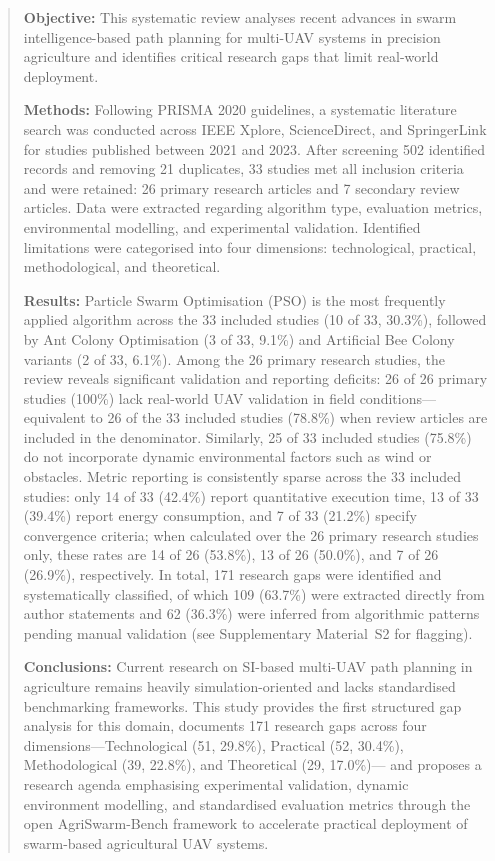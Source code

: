 \documentclass[review,3p,times]{elsarticle}
\begin{document}
\begin{frontmatter}
\begin{abstract}
\textbf{Objective:} This systematic review analyses recent advances in swarm
intelligence-based path planning for multi-UAV systems in precision agriculture and
identifies critical research gaps that limit real-world deployment.

\textbf{Methods:} Following PRISMA 2020 guidelines, a systematic literature search
was conducted across IEEE Xplore, ScienceDirect, and SpringerLink for studies
published between 2021 and 2023. After screening 502 identified records and removing
21 duplicates, 33 studies met all inclusion criteria and were retained: 26 primary
research articles and 7 secondary review articles. Data were extracted regarding
algorithm type, evaluation metrics, environmental modelling, and experimental
validation. Identified limitations were categorised into four dimensions:
technological, practical, methodological, and theoretical.

\textbf{Results:} Particle Swarm Optimisation (PSO) is the most frequently applied
algorithm across the 33 included studies (10 of 33, 30.3\%), followed by Ant Colony
Optimisation (3 of 33, 9.1\%) and Artificial Bee Colony variants (2 of 33, 6.1\%).
Among the 26 primary research studies, the review reveals significant validation and
reporting deficits: 26 of 26 primary studies (100\%) lack real-world UAV validation
in field conditions---equivalent to 26 of the 33 included studies (78.8\%) when
review articles are included in the denominator. Similarly, 25 of 33 included studies
(75.8\%) do not incorporate dynamic environmental factors such as wind or obstacles.
Metric reporting is consistently sparse across the 33 included studies: only 14 of
33 (42.4\%) report quantitative execution time, 13 of 33 (39.4\%) report energy
consumption, and 7 of 33 (21.2\%) specify convergence criteria; when calculated
over the 26 primary research studies only, these rates are 14 of 26 (53.8\%), 13 of
26 (50.0\%), and 7 of 26 (26.9\%), respectively. In total, 171 research gaps were identified and systematically classified, of which 109 (63.7\%) were extracted directly from author statements and 
62 (36.3\%) were inferred from algorithmic patterns pending manual validation 
(see Supplementary Material~S2 for flagging).

\textbf{Conclusions:} Current research on SI-based multi-UAV path planning in
agriculture remains heavily simulation-oriented and lacks standardised benchmarking
frameworks. This study provides the first structured gap analysis for this domain,
documents 171 research gaps across four dimensions---Technological (51, 29.8\%),
Practical (52, 30.4\%), Methodological (39, 22.8\%), and Theoretical (29, 17.0\%)---
and proposes a research agenda emphasising experimental validation, dynamic
environment modelling, and standardised evaluation metrics through the open
AgriSwarm-Bench framework to accelerate practical deployment of swarm-based
agricultural UAV systems.
\end{abstract}


\end{frontmatter}
\end{document}
